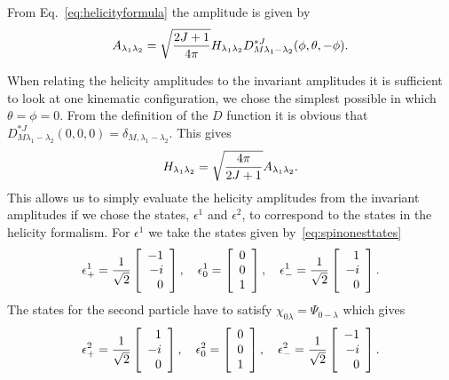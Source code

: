 From Eq.~\ref{eq:helicityformula} the amplitude is given by
\begin{equation}
A_{\lambda_1\lambda_2}=\sqrt{2J+1\over 4\pi}H_{\lambda_1\lambda_2}
D^{*J}_{M\lambda_1-\lambda_2}(\phi,\theta,-\phi).
\end{equation}

When relating the helicity amplitudes to the invariant amplitudes
it is sufficient to look at one kinematic configuration, we chose
the simplest possible in which $\theta=\phi=0$. From the
definition of the $D$ function it is obvious that 
$D^{*J}_{M\lambda_1-\lambda_2}(0,0,0)=\delta_{M,\lambda_1-\lambda_2}$.
This gives
\begin{equation}
H_{\lambda_1\lambda_2}=\sqrt{4\pi\over 2J+1}A_{\lambda_1\lambda_2}.
\end{equation}
This allows us to simply evaluate the helicity amplitudes from the
invariant amplitudes if we chose the states, $\epsilon^1$ and $\epsilon^2$,
to correspond to the states in the helicity formalism. 
For $\epsilon^1$ we take the states given by~\ref{eq:spinonesttates}
\begin{equation}
\epsilon^1_+={1\over\sqrt{2}}\left[\begin{array}{r}
          -1  \\
          -i  \\
          0  \\
          \end{array}\right],\quad
\epsilon^1_0=\left[\begin{array}{r}
          0  \\
          0  \\
          1  \\
          \end{array}\right],\quad
\epsilon^1_-={1\over\sqrt{2}}\left[\begin{array}{r}
          1  \\
          -i  \\
          0  \\
          \end{array}\right].
\end{equation}
The states for the second particle have to satisfy 
$\chi_{0\lambda}=\Psi_{0-\lambda}$ which gives
\begin{equation}
\epsilon^2_+={1\over\sqrt{2}}\left[\begin{array}{r}
          1  \\
          -i  \\
          0  \\
          \end{array}\right],\quad
\epsilon^2_0=\left[\begin{array}{r}
          0  \\
          0  \\
          1  \\
          \end{array}\right],\quad
\epsilon^2_-={1\over\sqrt{2}}\left[\begin{array}{r}
          -1  \\
          -i  \\
          0  \\
          \end{array}\right].
\end{equation}
